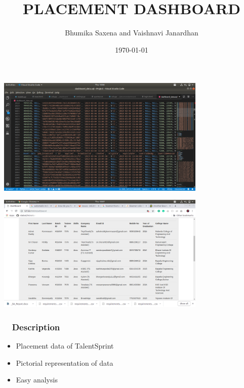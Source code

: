 \documentclass{beamer}
\title[Placement Dashboard]{PLACEMENT DASHBOARD } %
\author[Bhumika, Vaishnavi]{Bhumika Saxena and Vaishnavi Janardhan} %
\institute {TalentSprint WE}
{
\medskip
}
\date{\today} %
\begin{document}
\begin{frame}[plain]
\begin{center}
\includegraphics[width = 10cm]{8.png}
\end{center}
\end{frame}

\begin{frame}[plain]
\begin{center}
\includegraphics[width = 10cm]{9.png}
\end{center}
\end{frame}


\begin{frame}
\titlepage %
\end{frame}


\begin{frame}
\frametitle{~ Description}
\begin {itemize}
\item{Placement data of TalentSprint}
\item{Pictorial representation of data}
\item{Easy analysis}
\end{itemize}
\end{frame}
\end{document}
